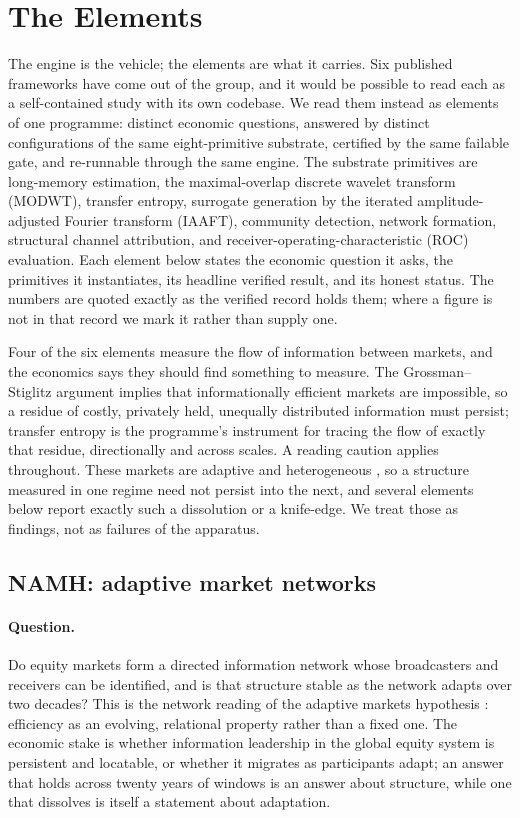 \section{The Elements}
\label{sec:elements}

The engine is the vehicle; the elements are what it carries. Six published
frameworks have come out of the group, and it would be possible to read each as
a self-contained study with its own codebase. We read them instead as elements
of one programme: distinct economic questions, answered by distinct
configurations of the same eight-primitive substrate, certified by the same
failable gate, and re-runnable through the same engine. The substrate primitives
are long-memory estimation, the maximal-overlap discrete wavelet transform
(MODWT), transfer entropy, surrogate generation by the iterated amplitude-adjusted
Fourier transform (IAAFT), community detection, network formation, structural
channel attribution, and receiver-operating-characteristic (ROC) evaluation.
Each element below states the economic question it asks, the primitives it
instantiates, its headline verified result, and its honest status. The numbers
are quoted exactly as the verified record holds them; where a figure is not in
that record we mark it rather than supply one.

Four of the six elements measure the flow of information between markets, and the
economics says they should find something to measure. The Grossman--Stiglitz
argument \citep{grossman1980} implies that informationally efficient markets are
impossible, so a residue of costly, privately held, unequally distributed
information must persist; transfer entropy is the programme's instrument for
tracing the flow of exactly that residue, directionally and across scales. A
reading caution applies throughout. These markets are adaptive and heterogeneous
\citep{lo2004}, so a structure measured in one regime need not persist into the
next, and several elements below report exactly such a dissolution or a
knife-edge. We treat those as findings, not as failures of the apparatus.

\subsection{NAMH: adaptive market networks}
\label{sec:elem-namh}

\paragraph{Question.} Do equity markets form a directed information network whose
broadcasters and receivers can be identified, and is that structure stable as the
network adapts over two decades? This is the network reading of the adaptive
markets hypothesis \citep{lo2004}: efficiency as an evolving, relational property
rather than a fixed one. The economic stake is whether information leadership in
the global equity system is persistent and locatable, or whether it migrates as
participants adapt; an answer that holds across twenty years of windows is an
answer about structure, while one that dissolves is itself a statement about
adaptation.

